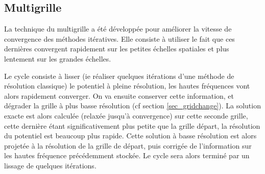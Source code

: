 \subsection{Multigrille}

La technique du multigrille a été développée pour améliorer la vitesse de convergence des méthodes itératives.
Elle consiste à utiliser le fait que ces dernières convergent rapidement sur les petites échelles spatiales et plus lentement sur les grandes échelles.%

%
%

Le cycle consiste à lisser (ie réaliser quelques itérations d'une méthode de résolution classique) le potentiel à pleine résolution, les hautes fréquences vont alors rapidement converger.
On va ensuite conserver cette information, et dégrader la grille à plus basse résolution (cf section \ref{sec_gridchange}).
La solution exacte est alors calculée (relaxée jusqu'à convergence) sur cette seconde grille, cette dernière étant significativement plus petite que la grille départ, la résolution du potentiel est beaucoup plus rapide.
Cette solution à basse résolution est alors projetée à la résolution de la grille de départ, puis corrigée de l'information sur les hautes fréquence précédemment stockée.
Le cycle sera alors terminé par un lissage de quelques itérations.

